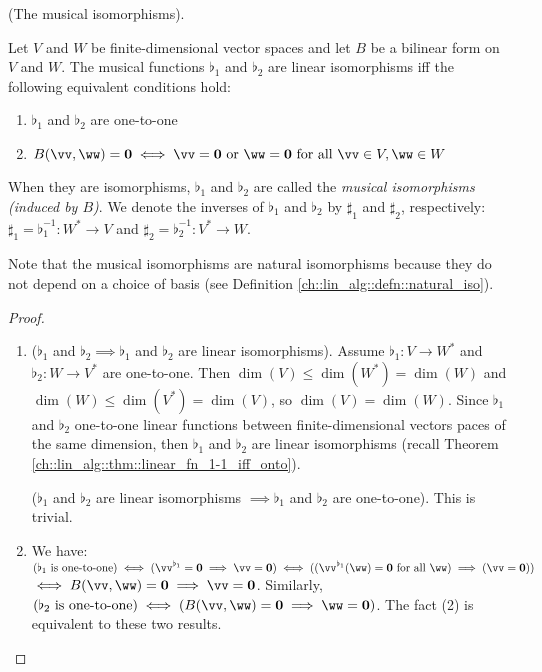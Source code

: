 \begin{theorem}
    (The musical isomorphisms).

    Let $V$ and $W$ be finite-dimensional vector spaces and let $B$ be a bilinear form on $V$ and $W$. The musical functions $\flat_1$ and $\flat_2$ are linear isomorphisms iff the following equivalent conditions hold:

    \begin{enumerate}
        \item $\flat_1$ and $\flat_2$ are one-to-one
        \item $B(\vv, \ww) = \mathbf{0} \iff \vv = \mathbf{0} \text{ or } \ww = \mathbf{0} \text{ for all } \vv \in V, \ww \in W$
    \end{enumerate}

    When they are isomorphisms, $\flat_1$ and $\flat_2$ are called the \textit{musical isomorphisms (induced by $B$)}. We denote the inverses of $\flat_1$ and $\flat_2$ by $\sharp_1$ and $\sharp_2$, respectively: $\sharp_1 = \flat_1^{-1}:W^* \rightarrow V$ and $\sharp_2 = \flat_2^{-1}:V^* \rightarrow W$.

    Note that the musical isomorphisms are natural isomorphisms because they do not depend on a choice of basis (see Definition \ref{ch::lin_alg::defn::natural_iso}).
\end{theorem}

\begin{proof}
    \mbox{} \\
    \begin{enumerate}
        \item ($\flat_1$ and $\flat_2 \implies \flat_1$ and $\flat_2$ are linear isomorphisms). Assume $\flat_1:V \rightarrow W^*$ and $\flat_2:W \rightarrow V^*$ are one-to-one. Then $\dim(V) \leq \dim(W^*) = \dim(W)$ and $\dim(W) \leq \dim(V^*) = \dim(V)$, so $\dim(V) = \dim(W)$. Since $\flat_1$ and $\flat_2$ one-to-one linear functions between finite-dimensional vectors paces of the same dimension, then $\flat_1$ and $\flat_2$ are linear isomorphisms (recall Theorem \ref{ch::lin_alg::thm::linear_fn_1-1_iff_onto}).

        ($\flat_1$ and $\flat_2$ are linear isomorphisms $\implies \flat_1$ and $\flat_2$ are one-to-one). This is trivial.
        
        \item We have: $(\flat_1 \text{ is one-to-one}) \iff (\vv^{\flat_1} = \mathbf{0} \implies \vv = \mathbf{0}) \iff ((\vv^{\flat_1}(\ww) = \mathbf{0} \text{ for all $\ww$}) \implies (\vv = \mathbf{0}))$ \\ $\iff B(\vv, \ww) = \mathbf{0} \implies \vv = \mathbf{0}$. Similarly, $(\flat_2 \text{ is one-to-one}) \iff (B(\vv, \ww) = \mathbf{0} \implies \ww = \mathbf{0})$. The fact (2) is equivalent to these two results.
    \end{enumerate}
\end{proof}

